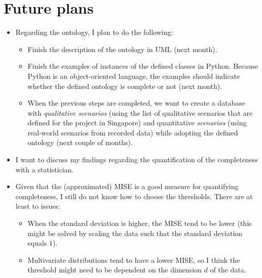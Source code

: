 \documentclass[10pt,final,a4paper,oneside,onecolumn]{article}
\begin{document}
\section{Future plans}

\begin{itemize}
	\item Regarding the ontology, I plan to do the following:
	\begin{itemize}
		\item Finish the description of the ontology in UML (next month).
		\item Finish the examples of instances of the defined classes in Python. Because Python is an object-oriented language, the examples should indicate whether the defined ontology is complete or not (next month).
		\item When the previous steps are completed, we want to create a database with \emph{qualitative scenarios} (using the list of qualitative scenarios that are defined for the project in Singapore) and quantitative \emph{scenarios} (using real-world scenarios from recorded data) while adopting the defined ontology (next couple of months).
	\end{itemize}
	\item I want to discuss my findings regarding the quantification of the completeness with a statistician. 
	\item Given that the (approximated) MISE is a good measure for quantifying completeness, I still do not know how to choose the thresholds. There are at least to issues:
	\begin{itemize}
		\item When the standard deviation is higher, the MISE tend to be lower (this might be solved by scaling the data such that the standard deviation equals $1$).
		\item Multivariate distributions tend to have a lower MISE, so I think the threshold might need to be dependent on the dimension $d$ of the data.
	\end{itemize}
\end{itemize}

\printbibliography
\end{document}
